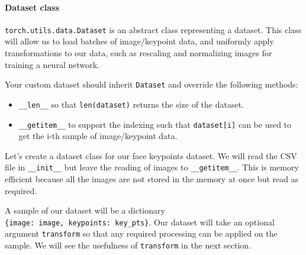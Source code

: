 \documentclass[11pt]{article}
\providecommand{\tightlist}{%
      \setlength{\itemsep}{0pt}\setlength{\parskip}{0pt}}
\begin{document}
\paragraph{Dataset class}\label{dataset-class}

\texttt{torch.utils.data.Dataset} is an abstract class representing a
dataset. This class will allow us to load batches of image/keypoint
data, and uniformly apply transformations to our data, such as rescaling
and normalizing images for training a neural network.

Your custom dataset should inherit \texttt{Dataset} and override the
following methods:

\begin{itemize}
\tightlist
\item
  \texttt{\_\_len\_\_} so that \texttt{len(dataset)} returns the size of
  the dataset.
\item
  \texttt{\_\_getitem\_\_} to support the indexing such that
  \texttt{dataset{[}i{]}} can be used to get the i-th sample of
  image/keypoint data.
\end{itemize}

Let's create a dataset class for our face keypoints dataset. We will
read the CSV file in \texttt{\_\_init\_\_} but leave the reading of
images to \texttt{\_\_getitem\_\_}. This is memory efficient because all
the images are not stored in the memory at once but read as required.

A sample of our dataset will be a dictionary
\texttt{\{\textquotesingle{}image\textquotesingle{}:\ image,\ \textquotesingle{}keypoints\textquotesingle{}:\ key\_pts\}}.
Our dataset will take an optional argument \texttt{transform} so that
any required processing can be applied on the sample. We will see the
usefulness of \texttt{transform} in the next section.
\end{document}
